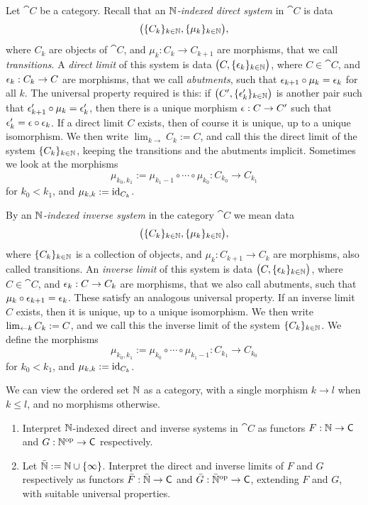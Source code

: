 Let $\cat{C}$ be a category. Recall that an 
{\em $\mathbb{N}$-indexed direct system} in $\cat{C}$ is data  
\[ \bigl( \{ C_k \}_{k \in \mathbb{N}}, \{ \mu_{k} \}_{k \in \mathbb{N}} \bigr) , \]
where $C_k$ are objects of $\cat{C}$, and 
$\mu_k : C_k \to C_{k + 1}$
are morphisms, that we call {\em transitions}.
A {\em direct limit} of this system is  data  
$\bigl( C , \{ \epsilon_{k} \}_{k \in \mathbb{N}} \bigr)$,
where $C \in \cat{C}$, and $\epsilon_k : C_k \to C$ are morphisms, that we call 
{\em abutments}, such that $\epsilon_{k + 1} \circ \mu_k = \epsilon_k$ for all $k$. The 
universal property required is this: if 
$\bigl( C' , \{ \epsilon'_{k} \}_{k \in \mathbb{N}} \bigr)$
is another pair such that $\epsilon'_{k + 1} \circ \mu_k = \epsilon'_k$, then
there is a unique morphism 
$\epsilon : C \to C'$ such that 
$\epsilon'_{k} = \epsilon \circ \epsilon_k$. 
If a direct limit $C$ exists, then of course it is unique, up to a unique 
isomorphism. We then write 
$\lim_{k \to} C_k := C$,
and call this the direct limit of the system $\{ C_k \}_{k \in \mathbb{N}}$, keeping 
the transitions and the abutments implicit. 
Sometimes we look at the morphisms 
\[ \mu_{k_0, k_1} := \mu_{k_1 - 1} \circ \cdots \circ \mu_{k_0} :
C_{k_0} \to C_{k_1} \]
for $k_0 < k_1$, and $\mu_{k, k} := \operatorname{id}_{C_k}$. 

By an {\em $\mathbb{N}$-indexed inverse system} in the category $\cat{C}$ we mean 
data 
\[ \bigl( \{ C_k \}_{k \in \mathbb{N}}, \{ \mu_k \}_{k \in \mathbb{N}} \bigr) , \]
where $\{ C_k \}_{k \in \mathbb{N}}$ is a collection of objects, and 
$\mu_k : C_{k + 1} \to C_{k}$ 
are morphisms, also called transitions. 
An {\em inverse limit} of this system is data  
$\bigl( C , \{ \epsilon_{k} \}_{k \in \mathbb{N}} \bigr)$,
where $C \in \cat{C}$, and $\epsilon_k : C \to C_k$ are morphisms, that we also call 
abutments, such that $\mu_k \circ \epsilon_{k + 1} = \epsilon_{k}$. These satisfy an 
analogous universal property. 
If an inverse limit $C$ exists, then it is unique, up to a unique 
isomorphism. We then write 
$\lim_{\leftarrow k} C_k := C$,
and we call this the inverse limit of the system $\{ C_k \}_{k \in \mathbb{N}}$.
We define the morphisms 
\[ \mu_{k_0, k_1} := \mu_{k_0} \circ \cdots \circ \mu_{k_1 - 1} :
C_{k_1} \to C_{k_0} \]
for $k_0 < k_1$, and $\mu_{k, k} := \operatorname{id}_{C_k}$. 

\begin{exer} \label{exer:3010}
We can view the ordered set $\mathbb{N}$ as a category, with a single 
morphism $k \to l$ when $k \leq l$, and no morphisms otherwise. 
\begin{enumerate}
\item Interpret $\mathbb{N}$-indexed direct and inverse systems in $\cat{C}$ as 
functors $F : \mathbb{N} \to \operatorname{\mathsf{C}}$ and $G : \mathbb{N}^{\mathrm{op}} \to \operatorname{\mathsf{C}}$ respectively. 

\item Let $\bar{\mathbb{N}} := \mathbb{N} \cup \{ \infty \}$. 
Interpret the direct and inverse limits of $F$ and $G$ respectively as 
functors $\bar{F} : \bar{\mathbb{N}} \to \operatorname{\mathsf{C}}$ and 
$\bar{G} : \bar{\mathbb{N}}^{\mathrm{op}} \to \operatorname{\mathsf{C}}$,
extending $F$ and $G$, with suitable universal properties. 
\end{enumerate}
\end{exer}

